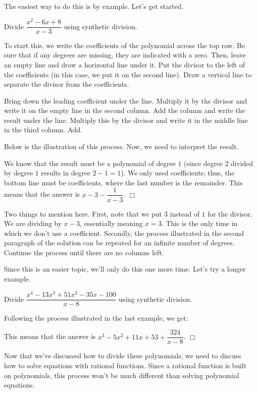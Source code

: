 \documentclass[lang=en,11pt]{elegantbook}
\begin{document}
The easiest way to do this is by example.  Let's get started.
\begin{example}
Divide $\dfrac{x^2-6x+8}{x-3}$ using synthetic division.
\end{example}
\begin{solution}
To start this, we write the coefficients of the polynomial across the top row.  Be sure that if any degrees are missing, they are indicated with a zero. Then, leave an empty line and draw a horizontal line under it.  Put the divisor to the left of the coefficients (in this case, we put it on the second line).  Draw a vertical line to separate the divisor from the coefficients.

Bring down the leading coefficient under the line.  Multiply it by the divisor and write it on the empty line in the second column.  Add the column and write the result under the line.  Multiply this by the divisor and write it in the middle line in the third column.  Add.

Below is the illustration of this process.  Now, we need to interpret the result.


We know that the result must be a polynomial of degree $1$ (since degree $2$ divided by degree $1$ results in degree $2-1=1$).  We only used coefficients; thus, the bottom line must be coefficients, where the last number is the remainder.  This means that the answer is $x-3-\dfrac{1}{x-3}$. $\Box$
\end{solution}
\begin{remark}
Two things to mention here.  First, note that we put $3$ instead of $1$ for the divisor.  We are dividing by $x-3$, essentially meaning $x=3$.  This is the only time in which we don't use a coefficient.  Secondly, the process illustrated in the second paragraph of the solution can be repeated for an infinite number of degrees.  Continue the process until there are no columns left.
\end{remark}
Since this is an easier topic, we'll only do this one more time.  Let's try a longer example.
\begin{example}
Divide $\dfrac{x^4-13x^3+51x^2-35x-100}{x-8}$ using synthetic division.
\end{example}
\begin{solution}
Following the process illustrated in the last example, we get:


This means that the answer is $x^3-5x^2+11x+53+\dfrac{324}{x-8}$. $\Box$
\end{solution}
\noindent Now that we've discussed how to divide these polynomials, we need to discuss how to solve equations with rational functions.  Since a rational function is built on polynomials, this process won't be much different than solving polynomial equations.
\end{document}
